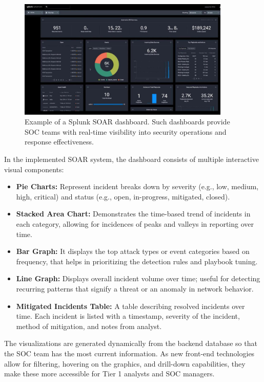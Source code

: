 \begin{figure}[ht]
    \centering
    \includegraphics[width=0.9\textwidth]{images/splunk_soar_dashboard.jpg}
    \caption[Example of a Splunk SOAR dashboard]{Example of a Splunk SOAR dashboard. Such dashboards provide SOC teams with real-time visibility into security operations and response effectiveness.}
    \label{fig:splunk-soar-dashboard}
\end{figure}

In the implemented SOAR system, the dashboard consists of multiple interactive visual components:

\begin{itemize}[noitemsep,topsep=0pt]
    \item \textbf{Pie Charts:} Represent incident breaks down by severity (e.g., low, medium, high, critical) and status (e.g., open, in-progress, mitigated, closed). 
    \item \textbf{Stacked Area Chart:} Demonstrates the time-based trend of incidents in each category, allowing for incidences of peaks and valleys in reporting over time. 
    \item \textbf{Bar Graph:} It displays the top attack types or event categories based on frequency, that helps in prioritizing the detection rules and playbook tuning.
    \item \textbf{Line Graph:} Displays overall incident volume over time; useful for detecting recurring patterns that signify a threat or an anomaly in network behavior.
    \item \textbf{Mitigated Incidents Table:} A table describing resolved incidents over time.  Each incident is listed with a timestamp, severity of the incident, method of mitigation, and notes from analyst.
\end{itemize}

The visualizations are generated dynamically from the backend database so that the SOC team has the most current information. As new front-end technologies allow for filtering, hovering on the graphics, and drill-down capabilities, they make these more accessible for Tier 1 analysts and SOC managers.

